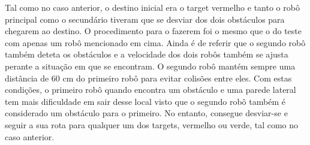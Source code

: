 Tal como no caso anterior, o destino inicial era o target vermelho e tanto o robô principal como o secundário tiveram que se desviar dos dois obstáculos para chegarem ao destino. O procedimento para o fazerem foi o mesmo que o do teste com apenas um robô mencionado em cima. Ainda é de referir que o segundo robô também deteta os obstáculos e a velocidade dos dois robôs também se ajusta perante a situação em que se encontram. O segundo robô mantém sempre uma distância de 60 cm do primeiro robô para evitar colisões entre eles. Com estas condições, o primeiro robô quando encontra um obstáculo e uma parede lateral tem mais dificuldade em sair desse local visto que o segundo robô também é considerado um obstáculo para o primeiro. No entanto, consegue desviar-se e seguir a sua rota para qualquer um dos targets, vermelho ou verde, tal como no caso anterior.